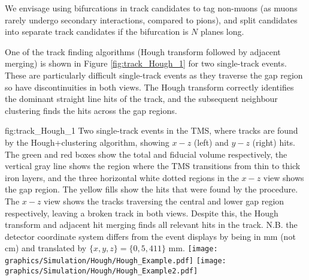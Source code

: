 We envisage using bifurcations in track candidates to tag non-muons (as muons rarely undergo secondary interactions, compared to pions), and split candidates into separate track candidates if the bifurcation is $N$ planes long.

One of the track finding algorithms (Hough transform followed by adjacent merging) is shown in Figure \ref{fig:track_Hough_1} for two single-track events. These are particularly difficult single-track events as they traverse the gap region so have discontinuities in both views. The Hough transform correctly identifies the dominant straight line hits of the track, and the subsequent neighbour clustering finds the hits across the gap regions.
\begin{dunefigure}[]{fig:track_Hough_1}
{Two single-track events in the TMS, where tracks are found by the Hough+clustering algorithm, showing $x-z$ (left) and $y-z$ (right) hits. The green and red boxes show the total and fiducial volume respectively, the vertical gray line shows the region where the TMS transitions from thin to thick iron layers, and the three horizontal white dotted regions in the $x-z$ view shows the gap region. The yellow fills show the hits that were found by the procedure. The $x-z$ view shows the tracks traversing the central and lower gap region respectively, leaving a broken track in both views. Despite this, the Hough transform and adjacent hit merging finds all relevant hits in the track. N.B. the detector coordinate system differs from the event displays by being in mm (not cm) and translated by $\{x,y,z\}=\{0, 5, 411\}$ mm. }
\texttt{[image: graphics/Simulation/Hough/Hough\_Example.pdf]} \texttt{[image: graphics/Simulation/Hough/Hough\_Example2.pdf]}
\end{dunefigure}

